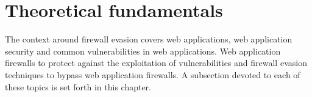 \section{Theoretical fundamentals}
\label{sec:fundamentals}
The context around firewall evasion covers web applications, web application security and common vulnerabilities in web applications. Web application firewalls to protect against the exploitation of vulnerabilities and firewall evasion techniques to bypass web application firewalls.
A subsection devoted to each of these topics is set forth in this chapter.

